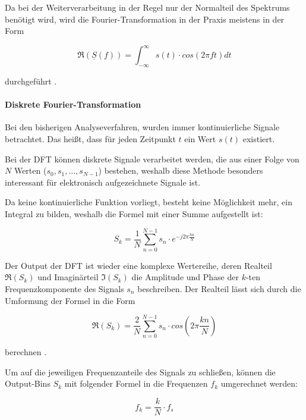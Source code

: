 Da bei der Weiterverarbeitung in der Regel nur der Normalteil des Spektrums benötigt wird, wird die Fourier-Transformation in der Praxis meistens in der Form

\begin{equation}
    \Re(\underline{S}(f)) = \int_{-\infty}^{\infty} s(t) \cdot cos(2\pi ft) dt
\end{equation}

durchgeführt \autocite[vgl.][S. 350f]{picard_fourier-analyse_1996}.

\paragraph{Diskrete Fourier-Transformation}

Bei den bisherigen Analyseverfahren, wurden immer kontinuierliche Signale betrachtet.
Das heißt, dass für jeden Zeitpunkt $t$ ein Wert $s(t)$ existiert.

Bei der \ac{DFT} können diskrete Signale verarbeitet werden, die aus einer Folge von $N$ Werten ($s_0, s_1, \dots, s_{N-1}$) bestehen, weshalb diese Methode besonders interessant für elektronisch aufgezeichnete Signale ist.

Da keine kontinuierliche Funktion vorliegt, besteht keine Möglichkeit mehr, ein Integral zu bilden, weshalb die Formel mit einer Summe aufgestellt ist:

\begin{equation}
    S_k = \frac{1}{N} \sum_{n=0}^{N-1} s_n \cdot e^{-j2\pi \frac{kn}{N}}
\end{equation}

Der Output der \ac{DFT} ist wieder eine komplexe Wertereihe, deren Realteil $\Re(S_k)$ und Imaginärteil $\Im(S_k)$ die Amplitude und Phase der $k$-ten Frequenzkomponente des Signals $s_n$ beschreiben.
Der Realteil lässt sich durch die Umformung der Formel in die Form

\begin{equation}
    \Re(S_k) = \frac{2}{N} \sum_{n=0}^{N-1} s_n \cdot cos(2\pi \frac{kn}{N})
\end{equation}

berechnen \autocite[vgl.][S. 567ff]{smith_scientist_1997}.

Um auf die jeweiligen Frequenzanteile des Signals zu schließen, können die Output-Bins $S_k$ mit folgender Formel in die Frequenzen $f_k$ umgerechnet werden:

\begin{equation}
    f_k = \frac{k}{N} \cdot f_s
\end{equation}


